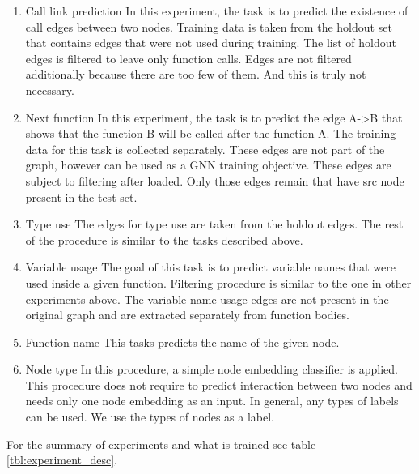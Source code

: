 \documentclass[a4paper,twoside]{article}
\begin{document}
\begin{enumerate}
    \item Call link prediction
    In this experiment, the task is to predict the existence of call edges between two nodes. Training data is taken from the holdout set that contains edges that were not used during training. The list of holdout edges is filtered to leave only function calls. Edges are not filtered additionally because there are too few of them. And this is truly not necessary.
    \item Next function
    In this experiment, the task is to predict the edge A->B that shows that the function B will be called after the function A. The training data for this task is collected separately. These edges are not part of the graph, however can be used as a GNN training objective. These edges are subject to filtering after loaded. Only those edges remain that have src node present in the test set. 
    \item Type use
    The edges for type use are taken from the holdout edges. The rest of the procedure is similar to the tasks described above. 
    \item Variable usage
    The goal of this task is to predict variable names that were used inside a given function. Filtering procedure is similar to the one in other experiments above. The variable name usage edges are not present in the original graph and are extracted separately from function bodies.
    \item Function name
    This tasks predicts the name of the given node. 
    \item Node type
    In this procedure, a simple node embedding classifier is applied. This procedure does not require to predict interaction between two nodes and needs only one node embedding as an input. In general, any types of labels can be used. We use the types of nodes as a label.
\end{enumerate}

For the summary of experiments and what is trained see table \ref{tbl:experiment_desc}.
\end{document}
